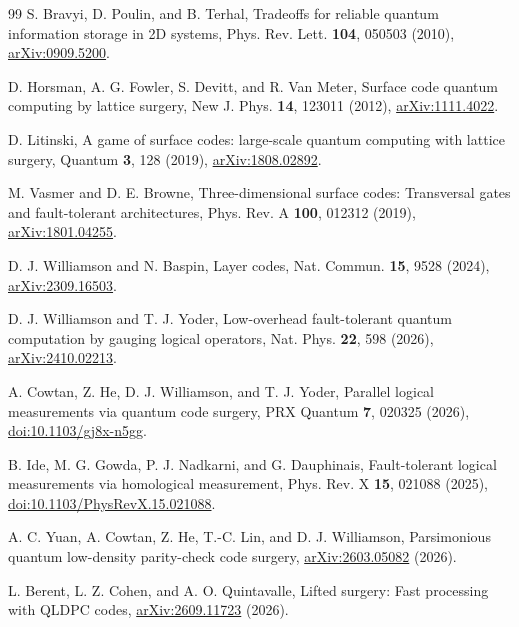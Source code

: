 \begin{thebibliography}{99}
S. Bravyi, D. Poulin, and B. Terhal, Tradeoffs for reliable quantum information storage in 2D systems, Phys. Rev. Lett. \textbf{104}, 050503 (2010), \href{https://arxiv.org/abs/0909.5200}{arXiv:0909.5200}.

D. Horsman, A. G. Fowler, S. Devitt, and R. Van Meter, Surface code quantum computing by lattice surgery, New J. Phys. \textbf{14}, 123011 (2012), \href{https://arxiv.org/abs/1111.4022}{arXiv:1111.4022}.

D. Litinski, A game of surface codes: large-scale quantum computing with lattice surgery, Quantum \textbf{3}, 128 (2019), \href{https://arxiv.org/abs/1808.02892}{arXiv:1808.02892}.

M. Vasmer and D. E. Browne, Three-dimensional surface codes: Transversal gates and fault-tolerant architectures, Phys. Rev. A \textbf{100}, 012312 (2019), \href{https://arxiv.org/abs/1801.04255}{arXiv:1801.04255}.

D. J. Williamson and N. Baspin, Layer codes, Nat. Commun. \textbf{15}, 9528 (2024), \href{https://arxiv.org/abs/2309.16503}{arXiv:2309.16503}.

D. J. Williamson and T. J. Yoder, Low-overhead fault-tolerant quantum computation by gauging logical operators, Nat. Phys. \textbf{22}, 598 (2026), \href{https://arxiv.org/abs/2410.02213}{arXiv:2410.02213}.

A. Cowtan, Z. He, D. J. Williamson, and T. J. Yoder, Parallel logical measurements via quantum code surgery, PRX Quantum \textbf{7}, 020325 (2026), \href{https://doi.org/10.1103/gj8x-n5gg}{doi:10.1103/gj8x-n5gg}.

B. Ide, M. G. Gowda, P. J. Nadkarni, and G. Dauphinais, Fault-tolerant logical measurements via homological measurement, Phys. Rev. X \textbf{15}, 021088 (2025), \href{https://doi.org/10.1103/PhysRevX.15.021088}{doi:10.1103/PhysRevX.15.021088}.

A. C. Yuan, A. Cowtan, Z. He, T.-C. Lin, and D. J. Williamson, Parsimonious quantum low-density parity-check code surgery, \href{https://arxiv.org/abs/2603.05082}{arXiv:2603.05082} (2026).

L. Berent, L. Z. Cohen, and A. O. Quintavalle, Lifted surgery: Fast processing with QLDPC codes, \href{https://arxiv.org/abs/2609.11723}{arXiv:2609.11723} (2026).


\end{thebibliography}
